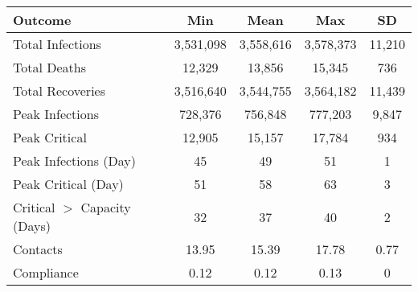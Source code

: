 \begin{table}[ht]
\centering
\begin{tabular}{lcccc}
  \hline
Outcome & Min & Mean & Max & SD \\ 
  \hline
Total Infections & 3,531,098 & 3,558,616 & 3,578,373 & 11,210 \\ 
  Total Deaths &    12,329 &    13,856 &    15,345 &    736 \\ 
  Total Recoveries & 3,516,640 & 3,544,755 & 3,564,182 & 11,439 \\ 
  Peak Infections &   728,376 &   756,848 &   777,203 &  9,847 \\ 
  Peak Critical &    12,905 &    15,157 &    17,784 &    934 \\ 
  Peak Infections (Day) & 45 & 49 & 51 & 1 \\ 
  Peak Critical (Day) & 51 & 58 & 63 & 3 \\ 
  Critical $>$ Capacity (Days) & 32 & 37 & 40 & 2 \\ 
  Contacts & 13.95 & 15.39 & 17.78 & 0.77 \\ 
  Compliance & 0.12 & 0.12 & 0.13 & 0 \\ 
   \hline
\end{tabular}
\end{table}
